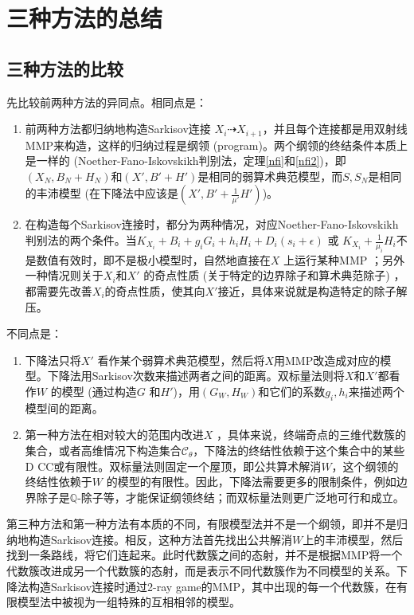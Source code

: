 \chapter{三种方法的总结}

\section{三种方法的比较}
先比较前两种方法的异同点。相同点是：
\begin{enumerate}
  \item 前两种方法都归纳地构造Sarkisov连接 $X_{i} \dashrightarrow X_{i+1}$，并且每个连接都是用双射线MMP来构造，这样的归纳过程是纲领 (program)。两个纲领的终结条件本质上是一样的 (Noether-Fano-Iskovskikh判别法，定理\ref{nfi}和\ref{nfi2})，即$(X_{N}, B_{N}+H_{N})$和$(X',B'+H')$是相同的弱算术典范模型，而$S,S_{N}$是相同的丰沛模型 (在下降法中应该是$(X',B'+ \frac{1}{\mu'}H')$)。
  \item 在构造每个Sarkisov连接时，都分为两种情况，对应Noether-Fano-Iskovskikh判别法的两个条件。当$K_{X_{i}}+B_{i}+g_{i}G_{i}+h_{i}H_{i}+D_{i}(s_{i}+\epsilon)$ 或 $K_{X_{i}}+ \frac{1}{\mu_{i}}H_{i}$不是数值有效时，即不是极小模型时，自然地直接在$X$ 上运行某种MMP ；另外一种情况则关于$X_{i}$和$X'$ 的奇点性质 (关于特定的边界除子和算术典范除子) ，都需要先改善$X_{i}$的奇点性质，使其向$X'$接近，具体来说就是构造特定的除子解压。 
\end{enumerate}
不同点是：
\begin{enumerate}
  \item 下降法只将$X'$ 看作某个弱算术典范模型，然后将$X$用MMP改造成对应的模型。下降法用Sarkisov次数来描述两者之间的距离。双标量法则将$X$和$X'$都看作$W$ 的模型 (通过构造$G$ 和$H'$)，用$(G_{W},H_{W})$和它们的系数$g_{i},h_{i}$来描述两个模型间的距离。
  \item 第一种方法在相对较大的范围内改进$X$ ，具体来说，终端奇点的三维代数簇的集合，或者高维情况下构造集合$\mathcal{C}_{\theta}$，下降法的终结性依赖于这个集合中的某些D CC或有限性。双标量法则固定一个屋顶，即公共算术解消$W$，这个纲领的终结性依赖于$W$ 的模型的有限性。因此，下降法需要更多的限制条件，例如边界除子是$\mathbb{Q}$-除子等，才能保证纲领终结；而双标量法则更广泛地可行和成立。  
\end{enumerate}

第三种方法和第一种方法有本质的不同，有限模型法并不是一个纲领，即并不是归纳地构造Sarkisov连接。相反，这种方法首先找出公共解消$W$上的丰沛模型，然后找到一条路线，将它们连起来。此时代数簇之间的态射，并不是根据MMP将一个代数簇改进成另一个代数簇的态射，而是表示不同代数簇作为不同模型的关系。下降法构造Sarkisov连接时通过2-ray game的MMP，其中出现的每一个代数簇，在有限模型法中被视为一组特殊的互相相邻的模型。
